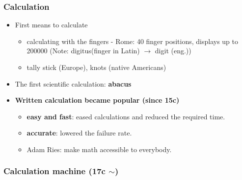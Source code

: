 \documentclass{standalone}
\begin{document}
\subsubsection*{Calculation}

\begin{itemize}
	\item First means to calculate
		\begin{itemize}
			\item calculating with the fingers - Rome: 40 finger positions, displays up to 200000 (Note: digitus(finger in Latin) $\rightarrow$ digit (eng.))
			\item tally stick (Europe), knots (native Americans)
		\end{itemize}
	\item The first scientific calculation: \textbf{abacus} 
	\item \textbf{Written calculation became popular (since 15c)}
		\begin{itemize}
			\item \textbf{easy and fast}: eased calculations and reduced the required time.
			\item \textbf{accurate}: lowered the failure rate.
			\item Adam Ries: make math accessible to everybody.
		\end{itemize} 
\end{itemize}

\subsubsection*{Calculation machine (17c $\sim$)}
\end{document}
